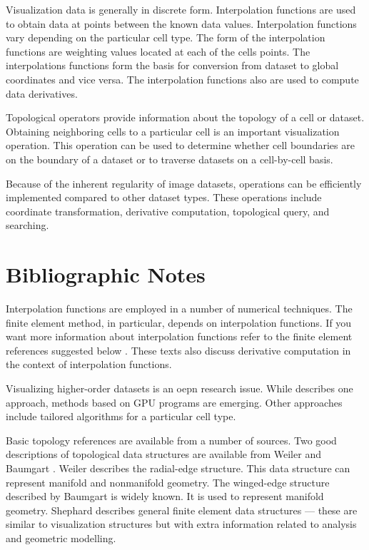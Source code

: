 Visualization data is generally in discrete form. Interpolation functions are used to obtain data at points between the known data values. Interpolation functions vary depending on the particular cell type. The form of the interpolation functions are weighting values located at each of the cells points. The interpolations functions form the basis for conversion from dataset to global coordinates and vice versa. The interpolation functions also are used to compute data derivatives.

Topological operators provide information about the topology of a cell or dataset. Obtaining neighboring cells to a particular cell is an important visualization operation. This operation can be used to determine whether cell boundaries are on the boundary of a dataset or to traverse datasets on a cell-by-cell basis.

Because of the inherent regularity of image datasets, operations can be efficiently implemented compared to other dataset types. These operations include coordinate transformation, derivative computation, topological query, and searching.

\section{Bibliographic Notes}

Interpolation functions are employed in a number of numerical techniques. The finite element method, in particular, depends on interpolation functions. If you want more information about interpolation functions refer to the finite element references suggested below \cite{Cook89} \cite{Gallagher75} \cite{Zienkiewicz87}. These texts also discuss derivative computation in the context of interpolation functions.

Visualizing higher-order datasets is an oepn research issue. While \cite{Schroeder06} describes one approach, methods based on GPU programs are emerging. Other approaches include tailored algorithms for a particular cell type.

Basic topology references are available from a number of sources. Two good descriptions of topological data structures are available from Weiler \cite{Weiler86} \cite{Weiler88} and Baumgart \cite{Baumgart74}. Weiler describes the radial-edge structure. This data structure can represent manifold and nonmanifold geometry. The winged-edge structure described by Baumgart is widely known. It is used to represent manifold geometry. Shephard \cite{Shephard88} describes general finite element data structures — these are similar to visualization structures but with extra information related to analysis and geometric modelling.

